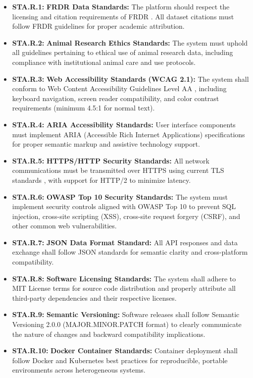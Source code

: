 \documentclass[12pt]{article}
\begin{document}
\begin{itemize}
    \item \textbf{STA.R.1:}\label{req:sta.r.1} \textbf{FRDR Data Standards:} The platform should respect the licensing and citation requirements of FRDR \cite{FRDR2024}. All dataset citations must follow FRDR guidelines for proper academic attribution.
    
    \item \textbf{STA.R.2:}\label{req:sta.r.2} \textbf{Animal Research Ethics Standards:} The system must uphold all guidelines pertaining to ethical use of animal research data, including compliance with institutional animal care and use protocols.
    
    \item \textbf{STA.R.3:} \textbf{Web Accessibility Standards (WCAG 2.1):} The system shall conform to Web Content Accessibility Guidelines Level AA \cite{WCAG2021}, including keyboard navigation, screen reader compatibility, and color contrast requirements (minimum 4.5:1 for normal text).
    
    \item \textbf{STA.R.4:} \textbf{ARIA Accessibility Standards:} User interface components must implement ARIA (Accessible Rich Internet Applications) specifications \cite{W3CARIA2022} for proper semantic markup and assistive technology support.
    
    \item \textbf{STA.R.5:} \textbf{HTTPS/HTTP Security Standards:} All network communications must be transmitted over HTTPS using current TLS standards \cite{HTTPSecurity2023}, with support for HTTP/2 to minimize latency.
    
    \item \textbf{STA.R.6:} \textbf{OWASP Top 10 Security Standards:} The system must implement security controls aligned with OWASP Top 10 \cite{OWASPTop10} to prevent SQL injection, cross-site scripting (XSS), cross-site request forgery (CSRF), and other common web vulnerabilities.
    
    \item \textbf{STA.R.7:} \textbf{JSON Data Format Standard:} All API responses and data exchange shall follow JSON standards for semantic clarity and cross-platform compatibility.
    
    \item \textbf{STA.R.8:} \textbf{Software Licensing Standards:} The system shall adhere to MIT License terms for source code distribution and properly attribute all third-party dependencies and their respective licenses.
    
    \item \textbf{STA.R.9:} \textbf{Semantic Versioning:} Software releases shall follow Semantic Versioning 2.0.0 (MAJOR.MINOR.PATCH format) to clearly communicate the nature of changes and backward compatibility implications.
    
    \item \textbf{STA.R.10:} \textbf{Docker Container Standards:} Container deployment shall follow Docker and Kubernetes best practices for reproducible, portable environments across heterogeneous systems.
\end{itemize}
\end{document}
